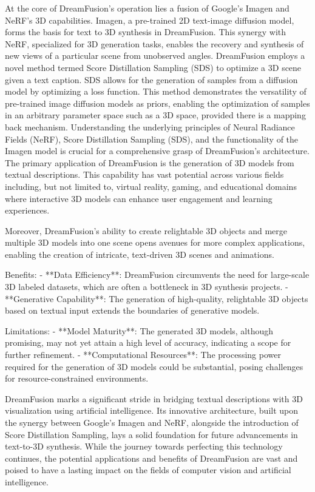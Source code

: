 At the core of DreamFusion's operation lies a fusion of Google's Imagen and NeRF's 3D capabilities. Imagen, a pre-trained 2D text-image diffusion model, forms the basis for text to 3D synthesis in DreamFusion. This synergy with NeRF, specialized for 3D generation tasks, enables the recovery and synthesis of new views of a particular scene from unobserved angles. DreamFusion employs a novel method termed Score Distillation Sampling (SDS) to optimize a 3D scene given a text caption. SDS allows for the generation of samples from a diffusion model by optimizing a loss function. This method demonstrates the versatility of pre-trained image diffusion models as priors, enabling the optimization of samples in an arbitrary parameter space such as a 3D space, provided there is a mapping back mechanism. Understanding the underlying principles of Neural Radiance Fields (NeRF), Score Distillation Sampling (SDS), and the functionality of the Imagen model is crucial for a comprehensive grasp of DreamFusion's architecture. The primary application of DreamFusion is the generation of 3D models from textual descriptions. This capability has vast potential across various fields including, but not limited to, virtual reality, gaming, and educational domains where interactive 3D models can enhance user engagement and learning experiences. 

Moreover, DreamFusion's ability to create relightable 3D objects and merge multiple 3D models into one scene opens avenues for more complex applications, enabling the creation of intricate, text-driven 3D scenes and animations.



Benefits:
- **Data Efficiency**: DreamFusion circumvents the need for large-scale 3D labeled datasets, which are often a bottleneck in 3D synthesis projects.
- **Generative Capability**: The generation of high-quality, relightable 3D objects based on textual input extends the boundaries of generative models.

Limitations:
- **Model Maturity**: The generated 3D models, although promising, may not yet attain a high level of accuracy, indicating a scope for further refinement.
- **Computational Resources**: The processing power required for the generation of 3D models could be substantial, posing challenges for resource-constrained environments.


DreamFusion marks a significant stride in bridging textual descriptions with 3D visualization using artificial intelligence. Its innovative architecture, built upon the synergy between Google's Imagen and NeRF, alongside the introduction of Score Distillation Sampling, lays a solid foundation for future advancements in text-to-3D synthesis. While the journey towards perfecting this technology continues, the potential applications and benefits of DreamFusion are vast and poised to have a lasting impact on the fields of computer vision and artificial intelligence.


